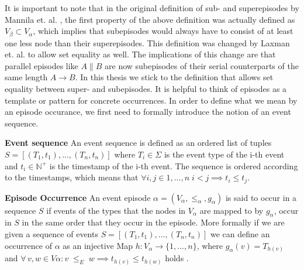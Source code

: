 It is important to note that in the original definition of sub- and superepisodes by Mannila et. al. \cite{mannila1995discovering}, the first property of the above definition was actually defined as $V_\beta \subset V_\alpha$, which implies that subepisodes would always have to consist of at least one less node than their superepisodes. This definition was changed by Laxman et. al. \cite{laxman2007fast} to allow set equality as well. The implications of this change are that parallel episodes like $A \| B$ are now subepisodes of their serial counterparts of the same length $A \rightarrow B$. In this thesis we stick to the definition that allows set equality between super- and subepisodes. \newline
It is helpful to think of episodes as a template or pattern for concrete occurrences. In order to define what we mean by an episode occurance, we first need to formally introduce the notion of an event sequence.

\begin{mydef}
\textbf{Event sequence} An event sequence is defined as an ordered list of tuples $S = [ (T_1,t_1),..., (T_n,t_n) ] $ where $T_i \in \Sigma$ is the event type of the i-th event and $t_i \in \mathbb{N}^+$ is the timestamp of the i-th event. The sequence is ordered according to the timestamps, which means that $\forall i,j \in {1,...,n} \; i<j \implies t_i \leq t_j$. %
\end{mydef}

\begin{mydef}
\label{def_episodeOccurrence}
\textbf{Episode Occurrence} An event episode $\alpha = (V_\alpha,{\leq}_{\alpha},g_\alpha)$ is said to occur in a sequence $S$ if events of the types that the nodes in $V_\alpha$ are mapped to by $g_\alpha$, occur in $S$ in the same order that they occur in the episode. More formally if we are given a sequence of events $S=[(T_1,t_1),...,(T_n,t_n)]$ we can define an occurrence of $\alpha$ as an injective Map $h:V_\alpha \rightarrow \{1,...,n\}$, where $g_\alpha (v) = T_{h(v)}$ and $\forall \, v,w \in V\alpha : v \;{\leq}_{E}\; w \implies t_{h(v)} \le t_{h(w)}$ holds \cite{mannila1995discovering}.
\end{mydef}

